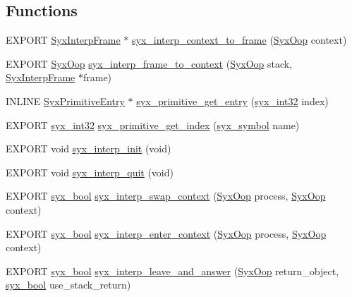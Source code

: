 \subsection*{Functions}
\begin{CompactItemize}
\item 
EXPORT \hyperlink{struct_syx_interp_frame}{SyxInterpFrame} $\ast$ \hyperlink{syx-interp_8h_5dffc11604b4760e555186fb26cce54c}{syx\_\-interp\_\-context\_\-to\_\-frame} (\hyperlink{syx-types_8h_1121caba2d40b2ce090b640762744ccd}{SyxOop} context)
\item 
EXPORT \hyperlink{syx-types_8h_1121caba2d40b2ce090b640762744ccd}{SyxOop} \hyperlink{syx-interp_8h_237d9e66928c5fb95a9b6e273512951e}{syx\_\-interp\_\-frame\_\-to\_\-context} (\hyperlink{syx-types_8h_1121caba2d40b2ce090b640762744ccd}{SyxOop} stack, \hyperlink{struct_syx_interp_frame}{SyxInterpFrame} $\ast$frame)
\item 
INLINE \hyperlink{struct_syx_primitive_entry}{SyxPrimitiveEntry} $\ast$ \hyperlink{syx-interp_8h_029bfe3a640d83819e4734b9994107b8}{syx\_\-primitive\_\-get\_\-entry} (\hyperlink{syx-types_8h_9f31c17555a2dfcf25da84b5c4a2e55b}{syx\_\-int32} index)
\item 
EXPORT \hyperlink{syx-types_8h_9f31c17555a2dfcf25da84b5c4a2e55b}{syx\_\-int32} \hyperlink{syx-interp_8h_ffbeb6d55f75e60ad16f0a87bb65a8a2}{syx\_\-primitive\_\-get\_\-index} (\hyperlink{syx-types_8h_9663af54b7b72f5d8be5f754ef356525}{syx\_\-symbol} name)
\item 
EXPORT void \hyperlink{syx-interp_8h_dbf95deb73b49620ce9b5c884e6cbcae}{syx\_\-interp\_\-init} (void)
\item 
EXPORT void \hyperlink{syx-interp_8h_7e6dca8bac2c5fc57dae4cb0d76f23eb}{syx\_\-interp\_\-quit} (void)
\item 
EXPORT \hyperlink{syx-types_8h_c6dc09b276b99fa1956364359139daab}{syx\_\-bool} \hyperlink{syx-interp_8h_aaa4ae62114dedc402940a51711c5c14}{syx\_\-interp\_\-swap\_\-context} (\hyperlink{syx-types_8h_1121caba2d40b2ce090b640762744ccd}{SyxOop} process, \hyperlink{syx-types_8h_1121caba2d40b2ce090b640762744ccd}{SyxOop} context)
\item 
EXPORT \hyperlink{syx-types_8h_c6dc09b276b99fa1956364359139daab}{syx\_\-bool} \hyperlink{syx-interp_8h_9a508ea64c04f29c84de6c4a320c86f8}{syx\_\-interp\_\-enter\_\-context} (\hyperlink{syx-types_8h_1121caba2d40b2ce090b640762744ccd}{SyxOop} process, \hyperlink{syx-types_8h_1121caba2d40b2ce090b640762744ccd}{SyxOop} context)
\item 
EXPORT \hyperlink{syx-types_8h_c6dc09b276b99fa1956364359139daab}{syx\_\-bool} \hyperlink{syx-interp_8h_f677bca3ba7ff8315ce0b1406b7a97b5}{syx\_\-interp\_\-leave\_\-and\_\-answer} (\hyperlink{syx-types_8h_1121caba2d40b2ce090b640762744ccd}{SyxOop} return\_\-object, \hyperlink{syx-types_8h_c6dc09b276b99fa1956364359139daab}{syx\_\-bool} use\_\-stack\_\-return)

\end{CompactItemize}
